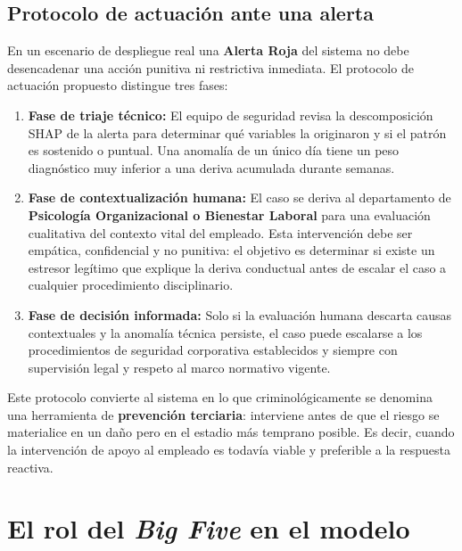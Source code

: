 \documentclass[IB]{TFUOC}%
\begin{document}
\subsection*{Protocolo de actuación ante una alerta}

En un escenario de despliegue real una \textbf{Alerta Roja} del sistema 
no debe desencadenar una acción punitiva ni restrictiva inmediata. 
El protocolo de actuación propuesto distingue tres fases:

\begin{enumerate}
    \item \textbf{Fase de triaje técnico:} El equipo de seguridad 
    revisa la descomposición SHAP de la alerta para determinar qué 
    variables la originaron y si el patrón es sostenido o puntual. 
    Una anomalía de un único día tiene un peso diagnóstico muy 
    inferior a una deriva acumulada durante semanas.
    
    \item \textbf{Fase de contextualización humana:} El caso se 
    deriva al departamento de \textbf{Psicología Organizacional o 
    Bienestar Laboral} para una evaluación cualitativa del contexto 
    vital del empleado. Esta intervención debe ser empática, 
    confidencial y no punitiva: el objetivo es determinar si existe 
    un estresor legítimo que explique la deriva conductual antes 
    de escalar el caso a cualquier procedimiento disciplinario.
    
    \item \textbf{Fase de decisión informada:} Solo si la evaluación 
    humana descarta causas contextuales y la anomalía técnica 
    persiste, el caso puede escalarse a los procedimientos de 
    seguridad corporativa establecidos y siempre con supervisión 
    legal y respeto al marco normativo vigente.
\end{enumerate}

\noindent Este protocolo convierte al sistema en lo que criminológicamente 
se denomina una herramienta de \textbf{prevención terciaria}: interviene 
antes de que el riesgo se materialice en un daño pero en el estadio más 
temprano posible. Es decir, cuando la intervención de apoyo al empleado es todavía 
viable y preferible a la respuesta reactiva.


\section{El rol del \textit{Big Five} en el modelo}
\end{document}
